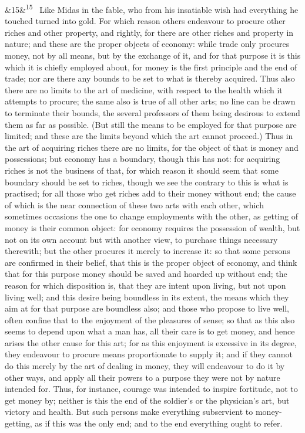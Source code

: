 \documentclass[12pt]{article}
\newcommand{\para}[1][]{\par\noindent\ifx&#1&\else\textsuperscript{\footnotesize #1}~\fi}
\begin{document}
\para[15] Like Midas in the fable, who from his insatiable wish had everything he touched turned into gold. For which reason others endeavour to procure other riches and other property, and rightly, for there are other riches and property in nature; and these are the proper objects of economy: while trade only procures money, not by all means, but by the exchange of it, and for that purpose it is this which it is chiefly employed about, for money is the first principle and the end of trade; nor are there any bounds to be set to what is thereby acquired. Thus also there are no limits to the art of medicine, with respect to the health which it attempts to procure; the same also is true of all other arts; no line can be drawn to terminate their bounds, the several professors of them being desirous to extend them as far as possible. (But still the means to be employed for that purpose are limited; and these are the limits beyond which the art cannot proceed.) Thus in the art of acquiring riches there are no limits, for the object of that is money and possessions; but economy has a boundary, though this has not: for acquiring riches is not the business of that, for which reason it should seem that some boundary should be set to riches, though we see the contrary to this is what is practised; for all those who get riches add to their money without end; the cause of which is the near connection of these two arts with each other, which sometimes occasions the one to change employments with the other, as getting of money is their common object: for economy requires the possession of wealth, but not on its own account but with another view, to purchase things necessary therewith; but the other procures it merely to increase it: so that some persons are confirmed in their belief, that this is the proper object of economy, and think that for this purpose money should be saved and hoarded up without end; the reason for which disposition is, that they are intent upon living, but not upon living well; and this desire being boundless in its extent, the means which they aim at for that purpose are boundless also; and those who propose to live well, often confine that to the enjoyment of the pleasures of sense; so that as this also seems to depend upon what a man has, all their care is to get money, and hence arises the other cause for this art; for as this enjoyment is excessive in its degree, they endeavour to procure means proportionate to supply it; and if they cannot do this merely by the art of dealing in money, they will endeavour to do it by other ways, and apply all their powers to a purpose they were not by nature intended for. Thus, for instance, courage was intended to inspire fortitude, not to get money by; neither is this the end of the soldier's or the physician's art, but victory and health. But such persons make everything subservient to money-getting, as if this was the only end; and to the end everything ought to refer.
\end{document}

